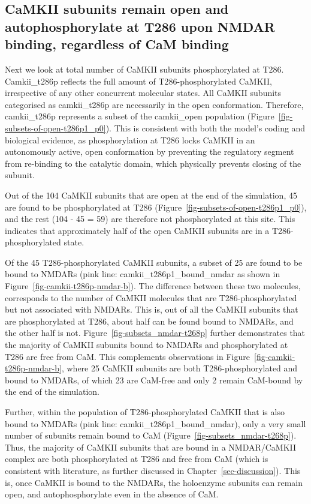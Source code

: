 \documentclass[
  11pt,
  letterpaper,
]{scrreprt}
\begin{document}
\subsection{CaMKII subunits remain open and autophosphorylate at T286
upon NMDAR binding, regardless of CaM
binding}\label{camkii-subunits-remain-open-and-autophosphorylate-at-t286-upon-nmdar-binding-regardless-of-cam-binding}

Next we look at total number of CaMKII subunits phosphorylated at T286.
Camkii\_t286p reflects the full amount of T286-phosphorylated CaMKII,
irrespective of any other concurrent molecular states. All CaMKII
subunits categorised as camkii\_t286p are necessarily in the open
conformation. Therefore, camkii\_t286p represents a subset of the
camkii\_open population (Figure~\ref{fig-subsets-of-open-t286p1_p0}).
This is consistent with both the model's coding and biological evidence,
as phosphorylation at T286 locks CaMKII in an autonomously active, open
conformation by preventing the regulatory segment from re-binding to the
catalytic domain, which physically prevents closing of the subunit.

Out of the 104 CaMKII subunits that are open at the end of the
simulation, 45 are found to be phosphorylated at T286
(Figure~\ref{fig-subsets-of-open-t286p1_p0}), and the rest (104 - 45 =
59) are therefore not phosphorylated at this site. This indicates that
approximately half of the open CaMKII subunits are in a
T286-phosphorylated state.

Of the 45 T286-phosphorylated CaMKII subunits, a subset of 25 are found
to be bound to NMDARs (pink line: camkii\_t286p1\_bound\_nmdar as shown
in Figure~\ref{fig-camkii-t286p-nmdar-b}). The difference between these
two molecules, corresponds to the number of CaMKII molecules that are
T286-phosphorylated but not associated with NMDARs. This is, out of all
the CaMKII subunits that are phosphorylated at T286, about half can be
found bound to NMDARs, and the other half is not.
Figure~\ref{fig-subsets_nmdar-t268p} further demonstrates that the
majority of CaMKII subunits bound to NMDARs and phosphorylated at T286
are free from CaM. This complements observations in
Figure~\ref{fig-camkii-t286p-nmdar-b}, where 25 CaMKII subunits are both
T286-phosphorylated and bound to NMDARs, of which 23 are CaM-free and
only 2 remain CaM-bound by the end of the simulation.

Further, within the population of T286-phosphorylated CaMKII that is
also bound to NMDARs (pink line: camkii\_t286p1\_bound\_nmdar), only a
very small number of subunits remain bound to CaM
(Figure~\ref{fig-subsets_nmdar-t268p}). Thus, the majority of CaMKII
subunits that are bound in a NMDAR/CaMKII complex are both
phosphorylated at T286 and free from CaM (which is consistent with
literature, as further discussed in Chapter~\ref{sec-discussion}). This
is, once CaMKII is bound to the NMDARs, the holoenzyme subunits can
remain open, and autophosphorylate even in the absence of CaM.
\end{document}
